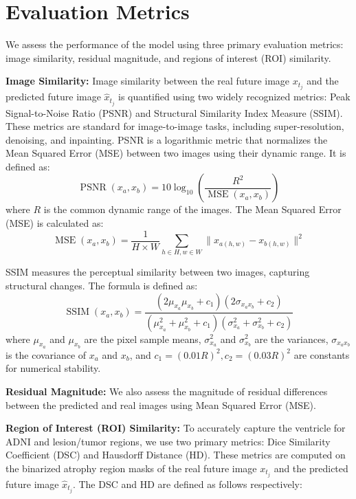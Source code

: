 \documentclass[twoside]{article}
\begin{document}
\section{Evaluation Metrics}
\label{app:evaluation_metrics}
We assess the performance of the model using three primary evaluation metrics: image similarity, residual magnitude, and regions of interest (ROI) similarity.

\textbf{Image Similarity: }
Image similarity between the real future image $x_{t_j}$ and the predicted future image $\hat{x}_{t_j}$ is quantified using two widely recognized metrics: Peak Signal-to-Noise Ratio (PSNR) and Structural Similarity Index Measure (SSIM). These metrics are standard for image-to-image tasks, including super-resolution, denoising, and inpainting. PSNR is a logarithmic metric that normalizes the Mean Squared Error (MSE) between two images using their dynamic range. It is defined as:
\begin{equation}
\operatorname{PSNR}(x_a, x_b) = 10 \log_{10} \left( \frac{R^2}{\operatorname{MSE}(x_a, x_b)} \right)
\label{eq:psnr}
\end{equation}
where $R$ is the common dynamic range of the images. The Mean Squared Error (MSE) is calculated as:
\begin{equation}
\operatorname{MSE}(x_a, x_b) = \frac{1}{H \times W} \sum_{h \in H, w \in W} \|x_{a(h,w)} - x_{b(h,w)}\|^2
\label{eq:mse}
\end{equation}

SSIM measures the perceptual similarity between two images, capturing structural changes. The formula is defined as:
\begin{equation}
\operatorname{SSIM}(x_a, x_b) = \frac{\left(2\mu_{x_a} \mu_{x_b} + c_1\right)\left(2\sigma_{x_a x_b} + c_2\right)}{\left(\mu_{x_a}^2 + \mu_{x_b}^2 + c_1\right)\left(\sigma_{x_a}^2 + \sigma_{x_b}^2 + c_2\right)}
\label{eq:ssim}
\end{equation}
where $\mu_{x_a}$ and $\mu_{x_b}$ are the pixel sample means, $\sigma_{x_a}^2$ and $\sigma_{x_b}^2$ are the variances, $\sigma_{x_a x_b}$ is the covariance of $x_a$ and $x_b$, and $c_1 = (0.01R)^2, c_2 = (0.03R)^2$ are constants for numerical stability.

\textbf{Residual Magnitude: }
We also assess the magnitude of residual differences between the predicted and real images using Mean Squared Error (MSE).

\textbf{Region of Interest (ROI) Similarity: }
To accurately capture the ventricle for ADNI and lesion/tumor regions, we use two primary metrics: Dice Similarity Coefficient (DSC) and Hausdorff Distance (HD). These metrics are computed on the binarized atrophy region masks of the real future image $x_{t_j}$ and the predicted future image $\hat{x}_{t_j}$. The DSC and HD are defined as follows respectively:
\end{document}

